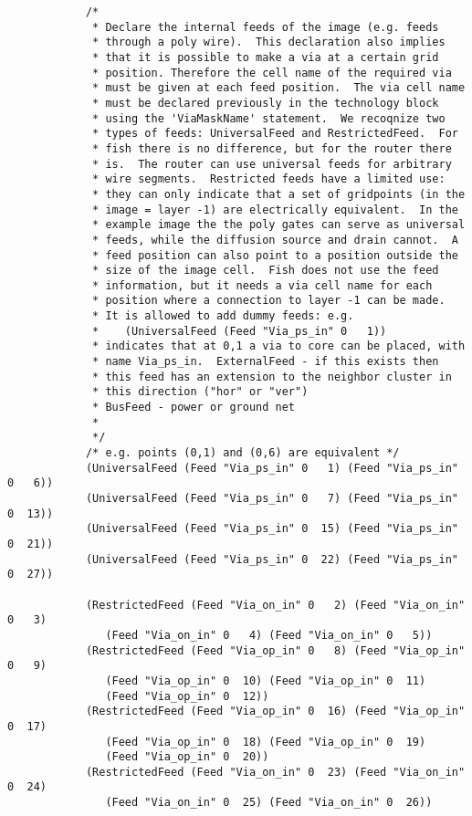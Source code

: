 {\begin{verbatim}
            /*
             * Declare the internal feeds of the image (e.g. feeds
             * through a poly wire).  This declaration also implies
             * that it is possible to make a via at a certain grid
             * position. Therefore the cell name of the required via
             * must be given at each feed position.  The via cell name
             * must be declared previously in the technology block
             * using the 'ViaMaskName' statement.  We recoqnize two
             * types of feeds: UniversalFeed and RestrictedFeed.  For
             * fish there is no difference, but for the router there
             * is.  The router can use universal feeds for arbitrary
             * wire segments.  Restricted feeds have a limited use:
             * they can only indicate that a set of gridpoints (in the
             * image = layer -1) are electrically equivalent.  In the
             * example image the the poly gates can serve as universal
             * feeds, while the diffusion source and drain cannot.  A
             * feed position can also point to a position outside the
             * size of the image cell.  Fish does not use the feed
             * information, but it needs a via cell name for each
             * position where a connection to layer -1 can be made.
             * It is allowed to add dummy feeds: e.g.
             *    (UniversalFeed (Feed "Via_ps_in" 0   1))
             * indicates that at 0,1 a via to core can be placed, with
             * name Via_ps_in.  ExternalFeed - if this exists then
             * this feed has an extension to the neighbor cluster in
             * this direction ("hor" or "ver")
             * BusFeed - power or ground net
             *
             */
            /* e.g. points (0,1) and (0,6) are equivalent */
            (UniversalFeed (Feed "Via_ps_in" 0   1) (Feed "Via_ps_in" 0   6))
            (UniversalFeed (Feed "Via_ps_in" 0   7) (Feed "Via_ps_in" 0  13))
            (UniversalFeed (Feed "Via_ps_in" 0  15) (Feed "Via_ps_in" 0  21))
            (UniversalFeed (Feed "Via_ps_in" 0  22) (Feed "Via_ps_in" 0  27))

            (RestrictedFeed (Feed "Via_on_in" 0   2) (Feed "Via_on_in" 0   3)
               (Feed "Via_on_in" 0   4) (Feed "Via_on_in" 0   5))
            (RestrictedFeed (Feed "Via_op_in" 0   8) (Feed "Via_op_in" 0   9)
               (Feed "Via_op_in" 0  10) (Feed "Via_op_in" 0  11) 
               (Feed "Via_op_in" 0  12))
            (RestrictedFeed (Feed "Via_op_in" 0  16) (Feed "Via_op_in" 0  17)
               (Feed "Via_op_in" 0  18) (Feed "Via_op_in" 0  19) 
               (Feed "Via_op_in" 0  20))
            (RestrictedFeed (Feed "Via_on_in" 0  23) (Feed "Via_on_in" 0  24)
               (Feed "Via_on_in" 0  25) (Feed "Via_on_in" 0  26))


\end{verbatim}}
